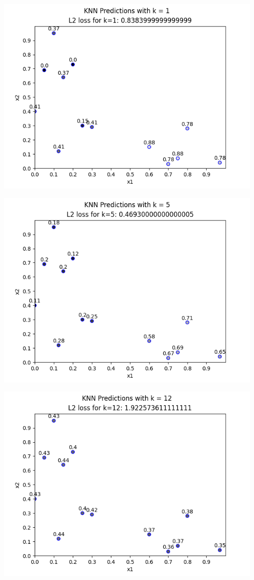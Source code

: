 \documentclass[submit]{harvardml}
\begin{document}
\begin{enumerate}
    \includegraphics[scale=0.6]{k1.png}

    \includegraphics[scale=0.6]{k5.png}

    \includegraphics[scale=0.6]{k12.png}


\end{enumerate}
\end{document}
